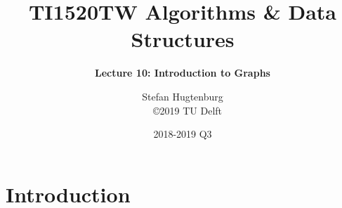 

\title[Algorithms \& Data Structures]{TI1520TW Algorithms \& Data Structures}
\subtitle{\color{cyan} \textbf{Lecture 10: Introduction to Graphs}}
\author{Stefan Hugtenburg\\ {\tiny{\qquad~~\copyright 2019 TU Delft}}}
\date{2018-2019 Q3}



\frame{\titlepage}

\section{Introduction}








%


\frame{\titlepage}


